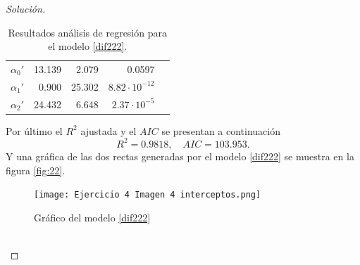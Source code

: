 \documentclass[10.5pt,notitlepage]{article}
\newenvironment{solucion}
  {\begin{proof}[Solución]}
  {\end{proof}}
\theoremstyle{plain}
\begin{document}
\begin{solucion}
\begin{table}[H]
\begin{tabular}{@{}l@{\hskip 0.3in}r@{\hskip 0.3in}r@{\hskip 0.3in}r@{\hskip 0.3in}r@{}}
            \(\alpha_{0}'\) &13.139 & 2.079 & 0.0597 \\
            \(\alpha_{1}'\) &0.900  & 25.302 & \(8.82\cdot 10^{-12}\)  \\
            \(\alpha_{2}'\) &24.432 & 6.648& \(2.37\cdot10^{-5}\)\\   
            \bottomrule
        \end{tabular}
        \caption{Resultados análisis de regresión para el modelo \eqref{dif222}.}
        \label{tab:reg13}
\end{table}
Por último el \(R^2\) ajustada y el \(AIC\) se presentan a continuación 
\begin{equation}\label{AIC RRRR}
    R^2 = 0.9818, \quad AIC = 103.953.
\end{equation}
Y una gráfica de las dos rectas generadas por el modelo \eqref{dif222} se muestra en la figura \eqref{fig:22}.
\begin{figure}[htb]
 \centering
 \texttt{[image: Ejercicio 4 Imagen 4 interceptos.png]}
 \caption{Gráfico del modelo \eqref{dif222}}
\label{fig:22}
\end{figure}
\\


\end{solucion}
\end{document}
